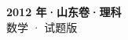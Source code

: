 \documentclass[zihao=-4, a4paper]{ctexart}
\begin{document}
\begin{center}
  {\Large\bfseries 2012 年·山东卷·理科}\\[4pt]
  {\large 数学 · 试题版}
\end{center}
\medskip
{}

\end{document}
